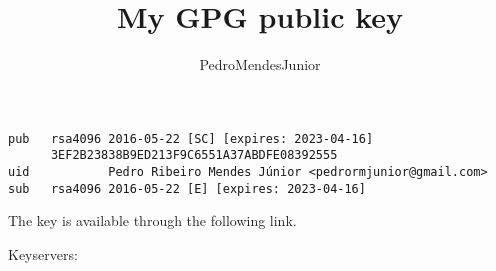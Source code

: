 

% 

\renewcommand\highlightauthorname[1]{#1}

\title{My GPG public key}
\author{\gls{PedroMendesJunior}\\%
}
\date{}



\maketitle

\begin{verbatim}
pub   rsa4096 2016-05-22 [SC] [expires: 2023-04-16]
      3EF2B23838B9ED213F9C6551A37ABDFE08392555
uid           Pedro Ribeiro Mendes Júnior <pedrormjunior@gmail.com>
sub   rsa4096 2016-05-22 [E] [expires: 2023-04-16]
\end{verbatim}

The key is available through the following link.

\begin{center}
\end{center}

Keyservers:

\\




